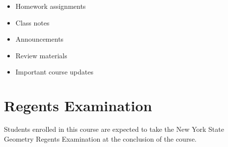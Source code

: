 \documentclass[10pt]{article}
\begin{document}
\begin{itemize}
    \item Homework assignments
    \item Class notes
    \item Announcements
    \item Review materials
    \item Important course updates
\end{itemize}

\section*{Regents Examination}

Students enrolled in this course are expected to take the New York State Geometry Regents Examination at the conclusion of the course.
\end{document}
